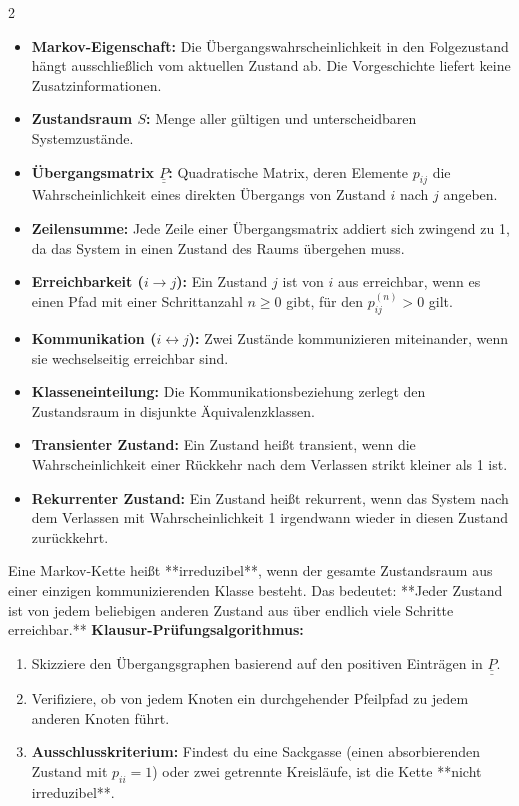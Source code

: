 \documentclass[a4paper, 9pt]{extarticle}
\begin{document}
\begin{multicols*}{2}
\begin{tcolorbox}[title={Theorie-Stichworte: Markov-Ketten}, colframe=markovviolet, colback=markovviolet!5, colbacktitle=markovviolet]
\begin{itemize}
    \item \textbf{Markov-Eigenschaft:} Die Übergangswahrscheinlichkeit in den Folgezustand hängt ausschließlich vom aktuellen Zustand ab. Die Vorgeschichte liefert keine Zusatzinformationen.
    \item \textbf{Zustandsraum $S$:} Menge aller gültigen und unterscheidbaren Systemzustände.
    \item \textbf{Übergangsmatrix $\underline{\underline{P}}$:} Quadratische Matrix, deren Elemente $p_{ij}$ die Wahrscheinlichkeit eines direkten Übergangs von Zustand $i$ nach $j$ angeben.
    \item \textbf{Zeilensumme:} Jede Zeile einer Übergangsmatrix addiert sich zwingend zu 1, da das System in einen Zustand des Raums übergehen muss.
    \item \textbf{Erreichbarkeit ($i \rightarrow j$):} Ein Zustand $j$ ist von $i$ aus erreichbar, wenn es einen Pfad mit einer Schrittanzahl $n \ge 0$ gibt, für den $p_{ij}^{(n)} > 0$ gilt.
    \item \textbf{Kommunikation ($i \leftrightarrow j$):} Zwei Zustände kommunizieren miteinander, wenn sie wechselseitig erreichbar sind.
    \item \textbf{Klasseneinteilung:} Die Kommunikationsbeziehung zerlegt den Zustandsraum in disjunkte Äquivalenzklassen.
    \item \textbf{Transienter Zustand:} Ein Zustand heißt transient, wenn die Wahrscheinlichkeit einer Rückkehr nach dem Verlassen strikt kleiner als 1 ist.
    \item \textbf{Rekurrenter Zustand:} Ein Zustand heißt rekurrent, wenn das System nach dem Verlassen mit Wahrscheinlichkeit 1 irgendwann wieder in diesen Zustand zurückkehrt.
\end{itemize}
\end{tcolorbox}

\begin{tcolorbox}[title={Theorie: Das Kriterium der Irreduzibilität}, colframe=markovviolet, colback=markovviolet!5, colbacktitle=markovviolet]
Eine Markov-Kette heißt **irreduzibel**, wenn der gesamte Zustandsraum aus einer einzigen kommunizierenden Klasse besteht. Das bedeutet: **Jeder Zustand ist von jedem beliebigen anderen Zustand aus über endlich viele Schritte erreichbar.**
\smallskip
\textbf{Klausur-Prüfungsalgorithmus:}
\begin{enumerate}
    \item Skizziere den Übergangsgraphen basierend auf den positiven Einträgen in $\underline{\underline{P}}$.
    \item Verifiziere, ob von jedem Knoten ein durchgehender Pfeilpfad zu jedem anderen Knoten führt.
    \item \textbf{Ausschlusskriterium:} Findest du eine Sackgasse (einen absorbierenden Zustand mit $p_{ii} = 1$) oder zwei getrennte Kreisläufe, ist die Kette **nicht irreduzibel**.
\end{enumerate}
\end{tcolorbox}


\end{multicols*}
\end{document}
